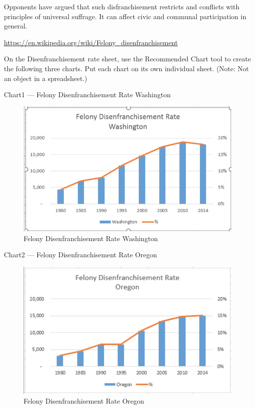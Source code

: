 Opponents have argued that such disfranchisement restricts and conflicts with principles of universal
suffrage. It can affect civic and communal participation in general.

\url{https://en.wikipedia.org/wiki/Felony_disenfranchisement}

On the Disenfranchisement rate sheet, use the Recommended Chart tool to create the following three
charts. Put each chart on its own individual sheet. (Note: Not an object in a spreadsheet.)

Chart1 — Felony Disenfranchisement Rate Washington


\begin{figure}[H]
	\centering
	\includegraphics[width=\maxwidth{.95\linewidth}]{gfx/ch04_fig56}
	\caption{Felony Disenfranchisement Rate Washington}
	\label{04:fig56}
\end{figure}






Chart2 — Felony Disenfranchisement Rate Oregon

\begin{figure}[H]
	\centering
	\includegraphics[width=\maxwidth{.95\linewidth}]{gfx/ch04_fig57}
	\caption{Felony Disenfranchisement Rate Oregon}
	\label{04:fig57}
\end{figure}




